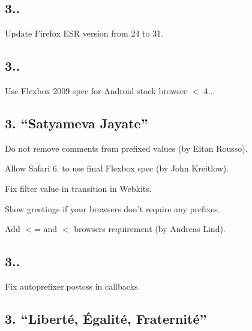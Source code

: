 \subsection*{3..}


\begin{DoxyItemize}
\item Update Firefox E\+SR version from 24 to 31.
\end{DoxyItemize}

\subsection*{3..}


\begin{DoxyItemize}
\item Use Flexbox 2009 spec for Android stock browser $<$ 4..
\end{DoxyItemize}

\subsection*{3. “\+Satyameva Jayate”}


\begin{DoxyItemize}
\item Do not remove comments from prefixed values (by Eitan Rousso).
\item Allow Safari 6. to use final Flexbox spec (by John Kreitlow).
\item Fix {\ttfamily filter} value in {\ttfamily transition} in Webkits.
\item Show greetings if your browsers don’t require any prefixes.
\item Add {\ttfamily $<$=} and {\ttfamily $<$} browsers requirement (by Andreas Lind).
\end{DoxyItemize}

\subsection*{3..}


\begin{DoxyItemize}
\item Fix {\ttfamily autoprefixer.\+postcss} in callbacks.
\end{DoxyItemize}

\subsection*{3. “\+Liberté, Égalité, Fraternité”}


